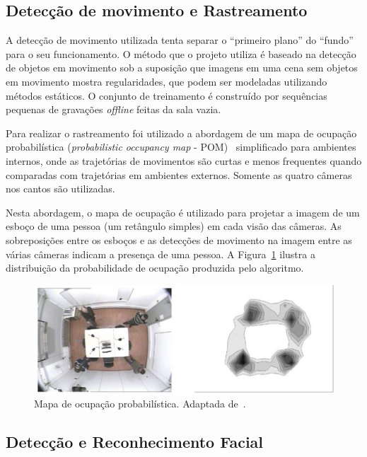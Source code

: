 \subsection{Detecção de movimento e Rastreamento}

A detecção de movimento utilizada tenta separar o ``primeiro plano'' do ``fundo'' para o seu funcionamento. O método que o projeto utiliza é baseado na detecção de objetos em movimento sob a suposição que imagens em uma cena sem objetos em movimento mostra regularidades, que podem ser modeladas utilizando métodos estáticos. O conjunto de treinamento é construído por sequências pequenas de gravações \textit{offline} feitas da sala vazia.

Para realizar o rastreamento foi utilizado a abordagem de um mapa de ocupação probabilística (\textit{probabilistic occupancy map} - POM)~\cite{pom} simplificado para ambientes internos, onde as trajetórias de movimentos são curtas e menos frequentes quando comparadas com trajetórias em ambientes externos. Somente as quatro câmeras nos cantos são utilizadas.

Nesta abordagem, o mapa de ocupação é utilizado para projetar a imagem de um esboço de uma pessoa (um retângulo simples) em cada visão das câmeras.  As sobreposições entre os esboços e as detecções de movimento na imagem entre as várias câmeras indicam a presença de uma pessoa. A Figura~\ref{fig:pom} ilustra a distribuição da probabilidade de ocupação produzida pelo algoritmo. 

\begin{figure}[hbt]
		\begin{center}
			\includegraphics[scale=0.5]{figuras/3.TrabalhosCorrelatos/pom.png}
		\end{center}
		\caption{Mapa de ocupação probabilística. Adaptada de~\cite{salah}.}
		\label{fig:pom}
	\end{figure}

\subsection{Detecção e Reconhecimento Facial}

